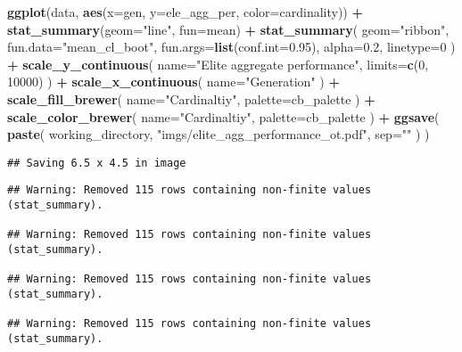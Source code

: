 \documentclass[]{book}
\newenvironment{Shaded}{\begin{snugshade}}{\end{snugshade}}
\newcommand{\DataTypeTok}[1]{\textcolor[rgb]{0.13,0.29,0.53}{#1}}
\newcommand{\DecValTok}[1]{\textcolor[rgb]{0.00,0.00,0.81}{#1}}
\newcommand{\FloatTok}[1]{\textcolor[rgb]{0.00,0.00,0.81}{#1}}
\newcommand{\KeywordTok}[1]{\textcolor[rgb]{0.13,0.29,0.53}{\textbf{#1}}}
\newcommand{\NormalTok}[1]{#1}
\newcommand{\OperatorTok}[1]{\textcolor[rgb]{0.81,0.36,0.00}{\textbf{#1}}}
\newcommand{\StringTok}[1]{\textcolor[rgb]{0.31,0.60,0.02}{#1}}
\begin{document}
\begin{Shaded}
\begin{Highlighting}[]
\KeywordTok{ggplot}\NormalTok{(data, }\KeywordTok{aes}\NormalTok{(}\DataTypeTok{x=}\NormalTok{gen, }\DataTypeTok{y=}\NormalTok{ele_agg_per, }\DataTypeTok{color=}\NormalTok{cardinality)) }\OperatorTok{+}
\StringTok{  }\KeywordTok{stat_summary}\NormalTok{(}\DataTypeTok{geom=}\StringTok{"line"}\NormalTok{, }\DataTypeTok{fun=}\NormalTok{mean) }\OperatorTok{+}
\StringTok{  }\KeywordTok{stat_summary}\NormalTok{(}
    \DataTypeTok{geom=}\StringTok{"ribbon"}\NormalTok{,}
    \DataTypeTok{fun.data=}\StringTok{"mean_cl_boot"}\NormalTok{,}
    \DataTypeTok{fun.args=}\KeywordTok{list}\NormalTok{(}\DataTypeTok{conf.int=}\FloatTok{0.95}\NormalTok{),}
    \DataTypeTok{alpha=}\FloatTok{0.2}\NormalTok{,}
    \DataTypeTok{linetype=}\DecValTok{0}
\NormalTok{  ) }\OperatorTok{+}
\StringTok{  }\KeywordTok{scale_y_continuous}\NormalTok{(}
    \DataTypeTok{name=}\StringTok{"Elite aggregate performance"}\NormalTok{,}
    \DataTypeTok{limits=}\KeywordTok{c}\NormalTok{(}\DecValTok{0}\NormalTok{, }\DecValTok{10000}\NormalTok{)}
\NormalTok{  ) }\OperatorTok{+}
\StringTok{  }\KeywordTok{scale_x_continuous}\NormalTok{(}
    \DataTypeTok{name=}\StringTok{"Generation"}
\NormalTok{  ) }\OperatorTok{+}
\StringTok{  }\KeywordTok{scale_fill_brewer}\NormalTok{(}
    \DataTypeTok{name=}\StringTok{"Cardinaltiy"}\NormalTok{,}
    \DataTypeTok{palette=}\NormalTok{cb_palette}
\NormalTok{  ) }\OperatorTok{+}
\StringTok{  }\KeywordTok{scale_color_brewer}\NormalTok{(}
    \DataTypeTok{name=}\StringTok{"Cardinaltiy"}\NormalTok{,}
    \DataTypeTok{palette=}\NormalTok{cb_palette}
\NormalTok{  ) }\OperatorTok{+}
\StringTok{  }\KeywordTok{ggsave}\NormalTok{(}
    \KeywordTok{paste}\NormalTok{(}
\NormalTok{      working_directory,}
      \StringTok{"imgs/elite_agg_performance_ot.pdf"}\NormalTok{,}
      \DataTypeTok{sep=}\StringTok{""}
\NormalTok{    )}
\NormalTok{  )}
\end{Highlighting}
\end{Shaded}

\begin{verbatim}
## Saving 6.5 x 4.5 in image
\end{verbatim}

\begin{verbatim}
## Warning: Removed 115 rows containing non-finite values (stat_summary).

## Warning: Removed 115 rows containing non-finite values (stat_summary).

## Warning: Removed 115 rows containing non-finite values (stat_summary).

## Warning: Removed 115 rows containing non-finite values (stat_summary).
\end{verbatim}
\end{document}
